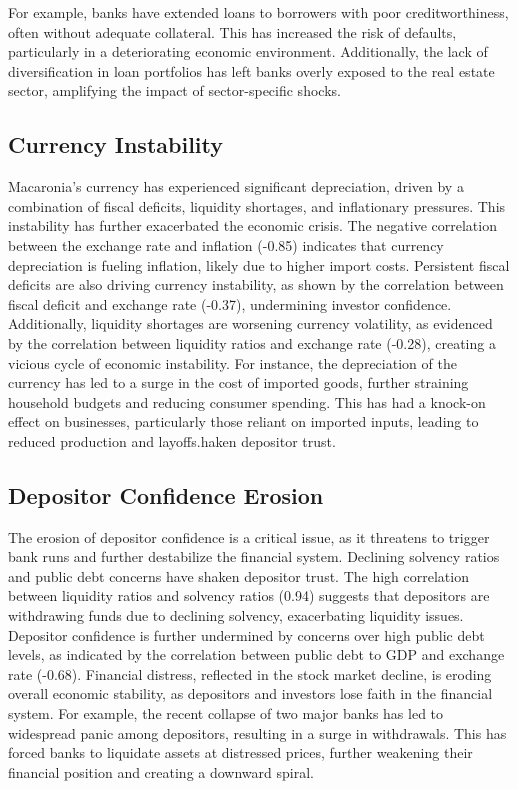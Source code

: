 For example, banks have extended loans to borrowers with poor creditworthiness, often without adequate collateral. This has increased the risk of defaults, particularly in a deteriorating economic environment. Additionally, the lack of diversification in loan portfolios has left banks overly exposed to the real estate sector, amplifying the impact of sector-specific shocks.

\subsection{Currency Instability}

Macaronia’s currency has experienced significant depreciation, driven by a combination of fiscal deficits, liquidity shortages, and inflationary pressures. This instability has further exacerbated the economic crisis. The negative correlation between the exchange rate and inflation (-0.85) indicates that currency depreciation is fueling inflation, likely due to higher import costs. Persistent fiscal deficits are also driving currency instability, as shown by the correlation between fiscal deficit and exchange rate (-0.37), undermining investor confidence. Additionally, liquidity shortages are worsening currency volatility, as evidenced by the correlation between liquidity ratios and exchange rate (-0.28), creating a vicious cycle of economic instability.
For instance, the depreciation of the currency has led to a surge in the cost of imported goods, further straining household budgets and reducing consumer spending. This has had a knock-on effect on businesses, particularly those reliant on imported inputs, leading to reduced production and layoffs.haken depositor trust.

\subsection{Depositor Confidence Erosion}


The erosion of depositor confidence is a critical issue, as it threatens to trigger bank runs and further destabilize the financial system.
Declining solvency ratios and public debt concerns have shaken depositor trust. The high correlation between liquidity ratios and solvency ratios (0.94) 
suggests that depositors are withdrawing funds due to declining solvency, exacerbating liquidity issues. Depositor confidence is further undermined by concerns 
over high public debt levels, as indicated by the correlation between public debt to GDP and exchange rate (-0.68). Financial distress, reflected in the stock market decline, 
is eroding overall economic stability, as depositors and investors lose faith in the financial system.
For example, the recent collapse of two major banks has led to widespread panic among depositors, resulting in a surge in withdrawals. 
This has forced banks to liquidate assets at distressed prices, further weakening their financial position and creating a downward spiral.
